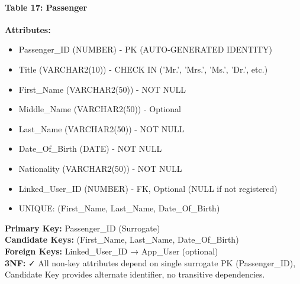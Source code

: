 \documentclass[12pt,a4paper,openany]{report}
\begin{document}
\paragraph{Table 17: Passenger}
\textbf{Attributes:} 
\begin{itemize}
    \item Passenger\_ID (NUMBER) - PK (AUTO-GENERATED IDENTITY)
    \item Title (VARCHAR2(10)) - CHECK IN ('Mr.', 'Mrs.', 'Ms.', 'Dr.', etc.)
    \item First\_Name (VARCHAR2(50)) - NOT NULL
    \item Middle\_Name (VARCHAR2(50)) - Optional
    \item Last\_Name (VARCHAR2(50)) - NOT NULL
    \item Date\_Of\_Birth (DATE) - NOT NULL
    \item Nationality (VARCHAR2(50)) - NOT NULL
    \item Linked\_User\_ID (NUMBER) - FK, Optional (NULL if not registered)
    \item UNIQUE: (First\_Name, Last\_Name, Date\_Of\_Birth)
\end{itemize}
\textbf{Primary Key:} Passenger\_ID (Surrogate)\\
\textbf{Candidate Keys:} (First\_Name, Last\_Name, Date\_Of\_Birth)\\
\textbf{Foreign Keys:} Linked\_User\_ID → App\_User (optional)\\
\textbf{3NF:} ✓ All non-key attributes depend on single surrogate PK (Passenger\_ID), Candidate Key provides alternate identifier, no transitive dependencies.
\end{document}
